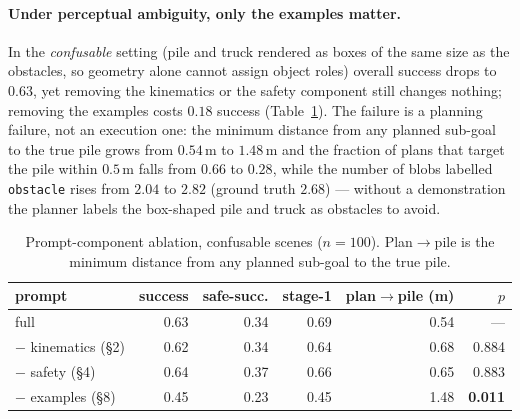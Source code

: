 \paragraph{Under perceptual ambiguity, only the examples matter.}
In the \emph{confusable} setting (pile and truck rendered as boxes of the same size as the
obstacles, so geometry alone cannot assign object roles) overall success drops to $0.63$, yet
removing the kinematics or the safety component still changes nothing; removing the examples
costs $0.18$ success (Table~\ref{tab:rq4-conf}). The failure is a planning failure, not an
execution one: the minimum distance from any planned sub-goal to the true pile grows from
$0.54$\,m to $1.48$\,m and the fraction of plans that target the pile within $0.5$\,m falls from
$0.66$ to $0.28$, while the number of blobs labelled \texttt{obstacle} rises from $2.04$ to
$2.82$ (ground truth $2.68$) --- without a demonstration the planner labels the box-shaped
pile and truck as obstacles to avoid.

\begin{table}[t]\centering
\caption{Prompt-component ablation, confusable scenes ($n{=}100$). Plan$\to$pile is the minimum
distance from any planned sub-goal to the true pile.}\label{tab:rq4-conf}
\begin{tabular}{lrrrrr}
\toprule
prompt & success & safe-succ. & stage-1 & plan$\to$pile (m) & $p$ \\
\midrule
full                & 0.63 & 0.34 & 0.69 & 0.54 & --- \\
$-$ kinematics (\S2)& 0.62 & 0.34 & 0.64 & 0.68 & 0.884 \\
$-$ safety (\S4)    & 0.64 & 0.37 & 0.66 & 0.65 & 0.883 \\
$-$ examples (\S8)  & 0.45 & 0.23 & 0.45 & 1.48 & \textbf{0.011} \\
\bottomrule
\end{tabular}
\end{table}

